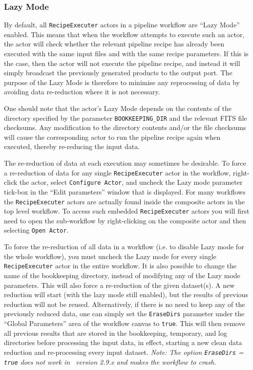 \subsubsection{Lazy Mode \label{sec:lazy_mode}}

By default, all {\tt RecipeExecuter} actors in a pipeline workflow are
``Lazy Mode'' enabled. This means that when the workflow attempts to
execute such an actor, the actor will check whether the relevant
pipeline recipe has already been executed with the same input files
and with the same recipe parameters. If this is the case, then the
actor will not execute the pipeline recipe, and instead it will simply
broadcast the previously generated products to the output port. The
purpose of the Lazy Mode is therefore to minimise any reprocessing of
data by avoiding data re-reduction where it is not necessary.
  
One should note that the actor's Lazy Mode depends on the contents of
the directory specified by the parameter {\tt BOOKKEEPING\_DIR} and the relevant
FITS file checksums. Any modification to the directory contents and/or
the file checksums will cause the corresponding actor to run the pipeline
recipe again when executed, thereby re-reducing the input data.

The re-reduction of data at each execution may sometimes be desirable.
To force a re-reduction of data for any single {\tt RecipeExecuter} actor in
the workflow, right-click the actor, select {\tt Configure Actor}, and uncheck
the Lazy mode parameter tick-box in the ``Edit parameters'' window that is
displayed. For many workflows the {\tt RecipeExecuter} actors are actually found
inside the composite actors in the top level workflow. To access such embedded
{\tt RecipeExecuter} actors you will first need to open the sub-workflow
by right-clicking on the composite actor and then selecting {\tt Open Actor}.

To force the re-reduction of all data in a workflow (i.e. to disable
Lazy mode for the whole workflow), you must uncheck the Lazy mode for
every single {\tt RecipeExecuter} actor in the entire workflow.  It is
also possible to change the name of the bookkeeping directory, instead
of modifying any of the Lazy mode parameters. This will also force a
re-reduction of the given dataset(s). A new reduction will start (with
the lazy mode still enabled), but the results of previous reduction
will not be reused.  Alternatively, if there is no need to keep any of
the previously reduced data, one can simply set the {\tt EraseDirs}
parameter under the ``Global Parameters'' area of the workflow canvas
to {\tt true}. This will then remove all previous results that are
stored in the bookkeeping, temporary, and log directories before
processing the input data, in effect, starting a new clean data
reduction and re-processing every input dataset.  {\it Note: The
  option {\tt EraseDirs} = {\tt true} does not work in \
  version 2.9.x and makes the workflow to crash.}

